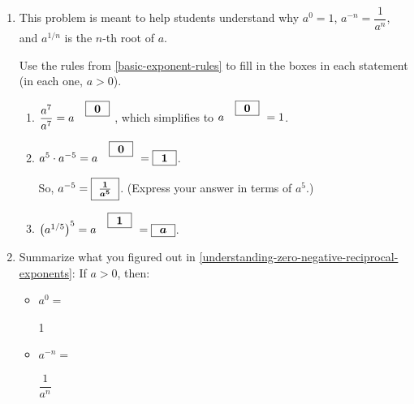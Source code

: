 \documentclass{article}
\begin{document}
\begin{enumerate}
\begin{enumerate}
    \begin{problem}[\vfill]
      $ab^5 (ab^3)^r$
    \end{problem}
    \begin{solution}
        $=ab^5a^rb^{3r}=a^{r+1}b^{5+3r}$
    \end{solution}

  \item
    \begin{problem}[\vfill]
      $\dfrac{(2a^3)^4}{a^5} + 6 a^3 - 5a^7$\\
    \end{problem}
    \begin{solution}
        $=\dfrac{2^4a^{3\cdot 4}}{a^5} + 6a^3-5a^7=\dfrac{16a^{12}}{a^5}+6a^3-5a^7=16a^7+6a^3-5a^7=11a^7+6a^3$
    \end{solution}

  \end{enumerate}

\item  \label{understanding-zero-negative-reciprocal-exponents}

  \begin{workshop}
    This problem is meant to help students understand why $a^0 = 1$, $a^{-n} = \dfrac{1}{a^n}$, and $a^{1/n}$ is the $n$-th root of $a$.
  \end{workshop}

  Use the rules from \ref{basic-exponent-rules} to fill in the boxes in each statement (in each one, $a > 0$).

  \begin{enumerate}
  \item $\dfrac{a^7}{a^7} = a^{\raisebox{1ex}{\cfitbox[\vphantom{1}]{0.2in}{0}}}$, which simplifies to $a^{\raisebox{1ex}{\cfitbox[\vphantom{1}]{0.2in}{0}}} = 1$.

  \item $a^5 \cdot a^{-5} = a^{\raisebox{1ex}{\cfitbox[\vphantom{1}]{0.2in}{0}}} = \cfitbox[\vphantom{\int}]{0.2in}{1}$.

    So, $a^{-5} = \cfitbox[\vphantom{\dfrac{1}{1}}]{0.25in}{\frac{1}{a^5}}$. (Express your answer in terms of $a^5$.)

  \item $\left( a^{1/5} \right)^5 = a^{\raisebox{1ex}{\cfitbox[\vphantom{1}]{0.2in}{1}}} = \cfitbox[\vphantom{\int}]{0.2in}{a}$.

  \end{enumerate}

\item  \label{summarize-zero-negative-reciprocal-exponents} Summarize what you figured out in \ref{understanding-zero-negative-reciprocal-exponents}: If $a > 0$, then:
  \begin{itemize}
  \item $a^0 = $
    \begin{solution}
        1
    \end{solution}
  \item $a^{-n} = $
  \begin{solution} 
  $\dfrac{1}{a^n}$
  \end{solution}


\end{itemize}
\end{enumerate}
\end{document}
